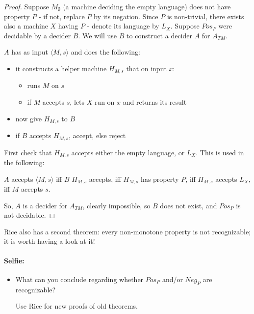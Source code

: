 
\begin{proof}
Suppose $M_\emptyset$ (a machine deciding the empty language) does not
have property $P$ - if not, replace $P$ by its negation. Since $P$ is
non-trivial, there exists also a machine $X$ having $P$ - denote
its language by $L_X$. Suppose $Pos_P$ were decidable by a decider
$B$. We will use $B$ to construct a decider $A$ for $A_{TM}$.

$A$ has as input $\langle M,s \rangle$ and does the following:
\begin{itemize}
\item it constructs a helper machine $H_{M,s}$ that on input $x$:

\begin{itemize}
\item runs $M$ on $s$
\item if $M$ accepts $s$, lets $X$ run on $x$ and returns its result
\end{itemize}

\item now give $H_{M,s}$ to $B$
\item if $B$ accepts $H_{M,s}$, accept, else reject
\end{itemize}
First check that $H_{M,s}$ accepts either the empty language, or
$L_X$. This is used in the following:


$A$ accepts $\langle M,s \rangle$ iff $B$ $H_{M,s}$ accepts, iff
%
$H_{M,s}$ has property $P$, iff
%
$H_{M,s}$ accepts $L_X$, iff
%
$M$ accepts $s$.

So, $A$ is a decider for $A_{TM}$, clearly impossible, so $B$ does not
exist, and $Pos_P$ is not decidable.
\end{proof} 

Rice also has a second theorem: every non-monotone property is not
recognizable; it is worth having a look at it!

\paragraph{Selfie:}
\begin{itemize}
\item[]
What can you conclude regarding whether $Pos_P$ and/or $Neg_P$ are
recognizable?

Use Rice for new proofs of old theorems.
\end{itemize}


